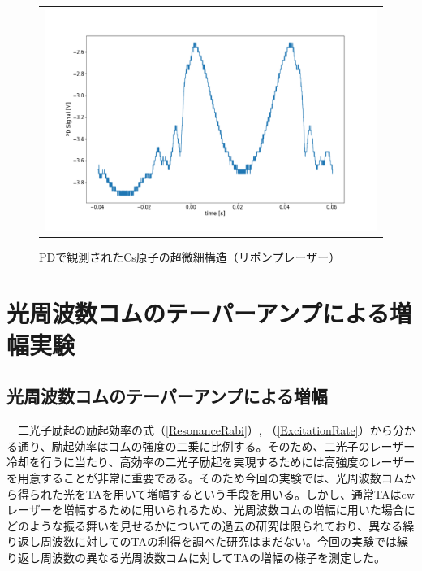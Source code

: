 \documentclass[uplatex, dvipdfmx, a4paper, report, papersize, 11pt]{jsbook}
\begin{document}
\newpage
\begin{figure}[htpb]
  \centering
    \begin{tabular}{c}
      \begin{minipage}{1\hsize}
        \centering
          \includegraphics[keepaspectratio,  scale=0.35,  angle=0]
                          {figures/saturated-absorption/Repump_PD_signal.png}
                          \caption{PDで観測されたCs原子の超微細構造（リポンプレーザー）}
                          \label{Repump_PD_signal}
      \end{minipage}
    \end{tabular}
\end{figure}




\newpage
\chapter{光周波数コムのテーパーアンプによる増幅実験}
\section{光周波数コムのテーパーアンプによる増幅}
　二光子励起の励起効率の式（\ref{ResonanceRabi}）, （\ref{ExcitationRate}）から分かる通り、励起効率はコムの強度の二乗に比例する。そのため、二光子のレーザー冷却を行うに当たり、高効率の二光子励起を実現するためには高強度のレーザーを用意することが非常に重要である。そのため今回の実験では、光周波数コムから得られた光をTAを用いて増幅するという手段を用いる。しかし、通常TAはcwレーザーを増幅するために用いられるため、光周波数コムの増幅に用いた場合にどのような振る舞いを見せるかについての過去の研究は限られており、異なる繰り返し周波数に対してのTAの利得を調べた研究はまだない。今回の実験では繰り返し周波数の異なる光周波数コムに対してTAの増幅の様子を測定した。
\end{document}
